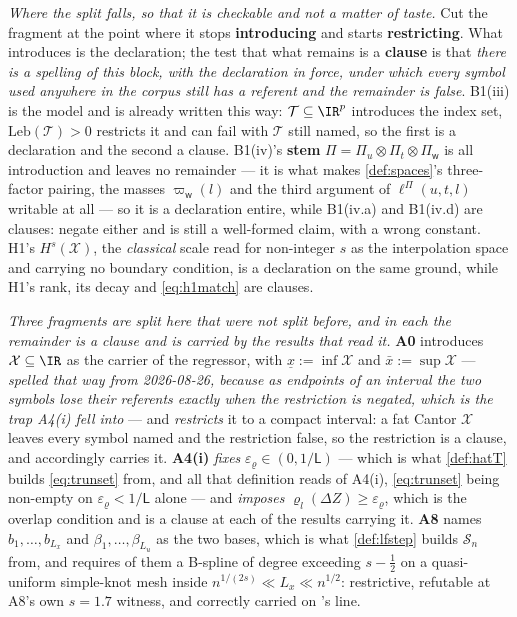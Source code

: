 \emph{Where the split falls, so that it is checkable and not a matter of taste.} Cut the fragment at the
point where it stops \textbf{introducing} and starts \textbf{restricting}. What introduces is the
declaration; the test that what remains is a \textbf{clause} is that \emph{there is a spelling of this
block, with the declaration in force, under which every symbol used anywhere in the corpus still has a
referent and the remainder is false}. B1(iii) is the model and is already written this way:
$\mathcal T\subseteq\IR^{p}$ introduces the index set, $\mathrm{Leb}(\mathcal T)>0$ restricts it and can
fail with $\mathcal T$ still named, so the first is a declaration and the second a clause. B1(iv)'s
\textbf{stem} $\Pi=\Pi_u\otimes\Pi_t\otimes\Pi_{\mathsf w}$ is all introduction and leaves no remainder
--- it is what makes \cref{def:spaces}'s three-factor pairing, the masses $\varpi_{\mathsf w}(l)$ and the
third argument of $\ell^\Pi(u,t,l)$ writable at all --- so it is a declaration entire, while B1(iv.a) and
B1(iv.d) are clauses: negate either and  is still a well-formed claim,
with a wrong constant. H1's $H^{s}(\mathcal X)$, the \emph{classical} scale read for non-integer $s$ as
the interpolation space and carrying no boundary condition, is a declaration on the same ground, while
H1's rank, its decay and \eqref{eq:h1match} are clauses.

\emph{Three fragments are split here that were not split before, and in each the remainder is a clause
and is carried by the results that read it.}
\textbf{A0} introduces $\mathcal X\subseteq\IR$ as the carrier of the regressor, with
$\underline x:=\inf\mathcal X$ and $\bar x:=\sup\mathcal X$ --- \emph{spelled that way from 2026-08-26,
because as endpoints of an interval the two symbols lose their referents exactly when the restriction is
negated, which is the trap A4(i) fell into} --- and \emph{restricts} it to a compact
interval: a fat Cantor $\mathcal X$ leaves every symbol named and the restriction false, so the
restriction is a clause, and  accordingly carries it. \textbf{A4(i)} \emph{fixes}
$\varepsilon_\varrho\in(0,1/\mathsf L)$ --- which is what \cref{def:hatT} builds \eqref{eq:trunset} from,
and all that definition reads of A4(i), \eqref{eq:trunset} being non-empty on
$\varepsilon_\varrho<1/\mathsf L$ alone --- and \emph{imposes}
$\varrho_l(\Delta Z)\ge\varepsilon_\varrho$, which is the overlap condition and is a clause at each of
the results carrying it. \textbf{A8} names
$b_1,\dots,b_{L_x}$ and $\beta_1,\dots,\beta_{L_u}$ as the two bases, which is what \cref{def:lfstep}
builds $\mathcal S_n$ from, and requires of them a B-spline of degree exceeding $s-\tfrac12$ on a
quasi-uniform simple-knot mesh inside $n^{1/(2s)}\ll L_x\ll n^{1/2}$: restrictive, refutable at A8's own
$s=1.7$ witness, and correctly carried on 's line.

